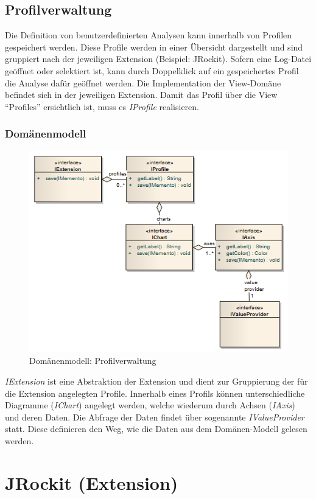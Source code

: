 \subsection{Profilverwaltung}
Die Definition von benutzerdefinierten Analysen kann innerhalb von Profilen gespeichert werden. Diese Profile werden in einer Übersicht dargestellt und sind gruppiert nach der jeweiligen Extension (Beispiel: JRockit). Sofern eine Log-Datei geöffnet oder selektiert ist, kann durch Doppelklick auf ein gespeichertes Profil die Analyse dafür geöffnet werden. Die Implementation der View-Domäne befindet sich in der jeweiligen Extension. Damit das Profil über die View ``Profiles'' ersichtlich ist, muss es \textit{IProfile} realisieren.
\subsubsection{Domänenmodell}
 \begin{figure}[H]
  	\centering
        	\caption{Domänenmodell: Profilverwaltung}
    	\includegraphics[width=13cm]{images/core_domain_profiles}
\end{figure}
\textit{IExtension} ist eine Abstraktion der Extension und dient zur Gruppierung der für die Extension angelegten Profile. Innerhalb eines Profils können unterschiedliche Diagramme (\textit{IChart}) angelegt werden, welche wiederum durch Achsen (\textit{IAxis}) und deren Daten. Die Abfrage der Daten findet über sogenannte \textit{IValueProvider} statt. Diese definieren den Weg, wie die Daten aus dem Domänen-Modell gelesen werden.

\section{JRockit (Extension)}
